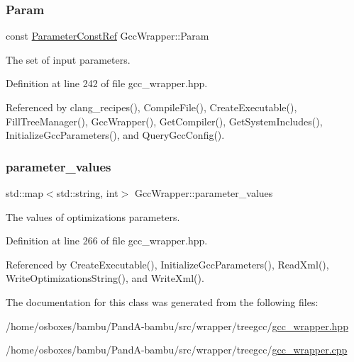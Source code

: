 \subsubsection{\texorpdfstring{Param}{Param}}
{\footnotesize\ttfamily const \hyperlink{Parameter_8hpp_a37841774a6fcb479b597fdf8955eb4ea}{Parameter\+Const\+Ref} Gcc\+Wrapper\+::\+Param\hspace{0.3cm}{\ttfamily [private]}}



The set of input parameters. 



Definition at line 242 of file gcc\+\_\+wrapper.\+hpp.



Referenced by clang\+\_\+recipes(), Compile\+File(), Create\+Executable(), Fill\+Tree\+Manager(), Gcc\+Wrapper(), Get\+Compiler(), Get\+System\+Includes(), Initialize\+Gcc\+Parameters(), and Query\+Gcc\+Config().

\mbox{\label{classGccWrapper_a90f60d17b1e94c6e869dcb056082af47}} 
\subsubsection{\texorpdfstring{parameter\+\_\+values}{parameter\_values}}
{\footnotesize\ttfamily std\+::map$<$std\+::string, int$>$ Gcc\+Wrapper\+::parameter\+\_\+values\hspace{0.3cm}{\ttfamily [private]}}



The values of optimizations parameters. 



Definition at line 266 of file gcc\+\_\+wrapper.\+hpp.



Referenced by Create\+Executable(), Initialize\+Gcc\+Parameters(), Read\+Xml(), Write\+Optimizations\+String(), and Write\+Xml().



The documentation for this class was generated from the following files\+:\begin{DoxyCompactItemize}
\item 
/home/osboxes/bambu/\+Pand\+A-\/bambu/src/wrapper/treegcc/\hyperlink{gcc__wrapper_8hpp}{gcc\+\_\+wrapper.\+hpp}\item 
/home/osboxes/bambu/\+Pand\+A-\/bambu/src/wrapper/treegcc/\hyperlink{gcc__wrapper_8cpp}{gcc\+\_\+wrapper.\+cpp}\end{DoxyCompactItemize}
